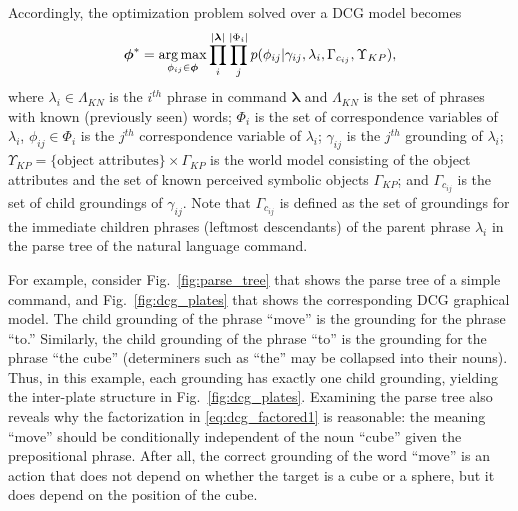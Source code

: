 Accordingly, the optimization problem solved over a DCG model becomes
\begin{equation}
\label{eq:dcg_factored1}
\begin{split}
\boldsymbol{\phi}^* = \operatorname*{\arg\max}_{\phi_{ij} \in \boldsymbol{\phi}} \prod_{i}^{|\boldsymbol{\lambda}|} \prod_{j}^{|\Phi_i|} p(\phi_{ij}|\gamma_{ij},\lambda_i,\Gamma_{c_{ij}} , \Upsilon_{KP}),
\end{split}
\end{equation}
where $\lambda_i \in \Lambda_{KN}$ is the $i^{th}$ phrase in command $\boldsymbol{\lambda}$ and $\Lambda_{KN}$ is the set of phrases with known (previously seen) words; $\Phi_i$ is the set of correspondence variables of $\lambda_i$, $\phi_{ij} \in \Phi_i$ is the $j^{th}$ correspondence variable of $\lambda_i$; $\gamma_{ij}$ is the $j^{th}$ grounding of $\lambda_i$; $\Upsilon_{KP} = \{\text{object attributes}\} \times \Gamma_{KP}$ is the world model consisting of the object attributes and the set of known perceived symbolic objects $\Gamma_{KP}$; and  $\Gamma_{c_{ij}}$ is the set of child groundings of $\gamma_{ij}$. Note that $\Gamma_{c_{ij}}$ is defined as the set of groundings for the immediate children phrases (leftmost descendants) of the parent phrase $\lambda_i$ in the parse tree of the natural language command.

For example, consider Fig.~\ref{fig:parse_tree} that shows the parse tree of a simple command, and Fig.~\ref{fig:dcg_plates} that shows the corresponding DCG graphical model. The child grounding of the phrase ``move'' is the grounding for the phrase ``to.'' Similarly, the child grounding of the phrase ``to'' is the grounding for the phrase ``the cube'' (determiners such as ``the'' may be collapsed into their nouns). Thus, in this example, each grounding has exactly one child grounding, yielding the inter-plate structure in Fig.~\ref{fig:dcg_plates}.
Examining the parse tree also reveals why the factorization in \eqref{eq:dcg_factored1} is reasonable: the meaning ``move'' should be conditionally independent of the noun ``cube'' given the prepositional phrase.
After all, the correct grounding of the word ``move'' is an action that does not depend on whether the target is a cube or a sphere, but it does depend on the position of the cube.


